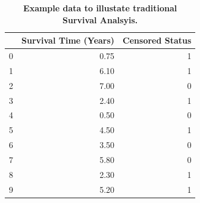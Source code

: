 \documentclass[10pt,letterpaper]{article}
\begin{document}
\begin{table}[!ht]
\begin{adjustwidth}{-2.25in}{0in} %
\caption{\label{tab:censoredexample} {\bf Example data to illustate traditional Survival Analsyis.}}
\begin{tabular}{lrr}
\toprule
{} &  Survival Time (Years) &  Censored Status \\
\midrule
0 &            0.75 &                1 \\
1 &            6.10 &                1 \\
2 &            7.00 &                0 \\
3 &            2.40 &                1 \\
4 &            0.50 &                0 \\
5 &            4.50 &                1 \\
6 &            3.50 &                0 \\
7 &            5.80 &                0 \\
8 &            2.30 &                1 \\
9 &            5.20 &                1 \\
\bottomrule
\end{tabular}
\end{adjustwidth}
\end{table}
\end{document}
